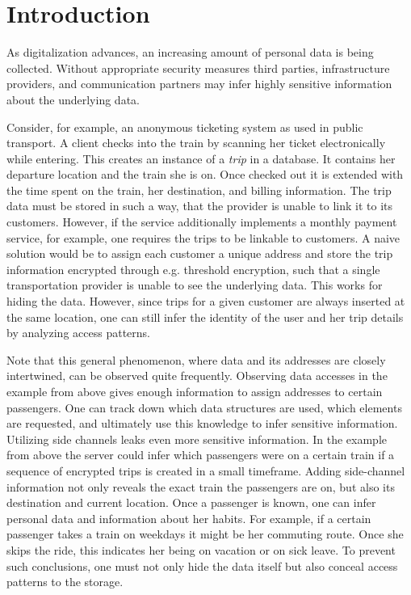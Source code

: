 \chapter{Introduction}\label{ch:introduction}
As digitalization advances, an increasing amount of personal data is being collected. 
Without appropriate security measures third parties, infrastructure providers, and communication partners may infer highly sensitive information about the underlying data.

Consider, for example, an anonymous ticketing system as used in public transport.
A client checks into the train by scanning her ticket electronically while entering.
This creates an instance of a \textit{trip} in a database.
It contains her departure location and the train she is on.
Once checked out it is extended with the time spent on the train, her destination, and billing information.
The trip data must be stored in such a way, that the provider is unable to link it to its customers.
However, if the service additionally implements a monthly payment service, for example, one requires the trips to be linkable to customers. 
A naive solution would be to assign each customer a unique address and store the trip information encrypted through e.g. threshold encryption, such that a single transportation provider is unable to see the underlying data.
This works for hiding the data.
However, since trips for a given customer are always inserted at the same location, one can still infer the identity of the user and her trip details by analyzing access patterns.

Note that this general phenomenon, where data and its addresses are closely intertwined, can be observed quite frequently.
Observing data accesses in the example from above gives enough information to assign addresses to certain passengers.
One can track down which data structures are used, which elements are requested, and ultimately use this knowledge to infer sensitive information.
Utilizing side channels leaks even more sensitive information.  
In the example from above the server could infer which passengers were on a certain train if a sequence of encrypted trips is created in a small timeframe.
Adding side-channel information not only reveals the exact train the passengers are on, but also its destination and current location.
Once a passenger is known, one can infer personal data and information about her habits.
For example, if a certain passenger takes a train on weekdays it might be her commuting route.
Once she skips the ride, this indicates her being on vacation or on sick leave.
To prevent such conclusions, one must not only hide the data itself but also conceal access patterns to the storage.

